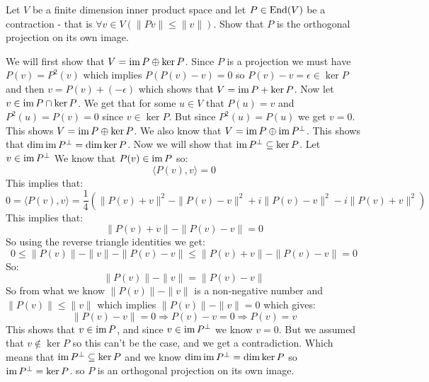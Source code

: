 \documentclass[11pt, a4paper]{article}
\begin{document}
\begin{exercise}
Let $V$ be a finite dimension inner product space and let $P\in\operatorname{End}(V)$ 
be a contraction - that is $\forall v\in V(\|Pv\|\le\|v\|)$.
Show that $P$ is the orthogonal projection on its own image.
\end{exercise}
\begin{solution}
We will first show that $V = \operatorname{im} P \oplus \ker P$. Since $P$ is a projection
we must have $P(v) = P^2(v)$ which implies $P(P(v)-v) = 0$ so 
$P(v) - v = \epsilon \in \ker P$ and then $v = P(v) + (-\epsilon)$ which
shows that $V = \operatorname{im} P + \ker P$. Now let $v\in \operatorname{im} P \cap \ker P$. We
get that for some $u\in V$ that $P(u) = v$ and $P^2(u) = P(v) = 0$ since
$v\in \ker P$. But since $P^2(u) = P(u)$ we get $v = 0$. This shows
$V = \operatorname{im} P \oplus \ker P$. We also know that $V = \operatorname{im} P \oplus \operatorname{im} P^\bot$.
This shows that $\dim\operatorname{im} P^\bot = \dim\ker P$. Now we will show that
$\operatorname{im} P^\perp \subseteq \ker P$. Let $v\in\operatorname{im} P^\perp$ We know that 
$P(v)\in\operatorname{im} P$ so:
\[
  \langle P(v), v\rangle = 0
\]
This implies that:
\[
  0 = \langle P(v), v\rangle = \frac{1}{4}
  \left(
    \|P(v)+v\|^2 - \|P(v)-v\|^2 + i\|P(v)-v\|^2 - i\|P(v)+v\|^2
  \right)
\]
This implies that:
\[
  \|P(v)+v\| - \|P(v)-v\| = 0
\]
So using the reverse triangle identities we get:
\[
  0 \le \|P(v)\| - \|v\| - \|P(v)-v\| \le \|P(v)+v\| - \|P(v)-v\| = 0
\]
So:
\[
  \|P(v)\| - \|v\| = \|P(v)-v\|
\]
So from what we know $\|P(v)\| - \|v\|$ is a non-negative number and
$\|P(v)\| \le \|v\|$ which implies  $\|P(v)\| - \|v\| = 0$ which gives:
\[
  \|P(v)-v\| = 0 \Rightarrow P(v) - v = 0 \Rightarrow P(v) = v
\]
This shows that $v\in\operatorname{im} P$, and since $v\in\operatorname{im} P^\bot$ we know $v=0$.
But we assumed that $v\notin\ker P$ so this can't be the case, and we get a
contradiction. Which means that $\operatorname{im} P^\perp \subseteq \ker P$ and we know
$\dim\operatorname{im} P^\bot = \dim\ker P$ so $\operatorname{im} P^\bot = \ker P$. so $P$ is an 
orthogonal projection on its own image.
\end{solution}
\end{document}
